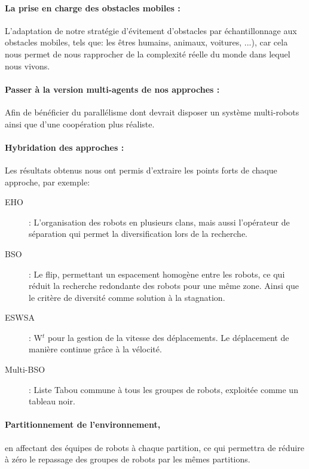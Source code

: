 \paragraph{La prise en charge des obstacles mobiles :} 
L'adaptation de notre stratégie d'évitement d'obstacles par échantillonnage aux obstacles mobiles, tels que: les êtres humains, animaux, voitures, ...), car cela nous permet de nous rapprocher de la complexité réelle du monde dans lequel nous vivons. 

\paragraph{Passer à la version multi-agents de nos approches :}
Afin de bénéficier du parallélisme dont devrait disposer un système multi-robots ainsi que d'une coopération plus réaliste.

\paragraph{Hybridation des approches :} Les résultats obtenus nous ont permis d'extraire les points forts de chaque approche, par exemple:
\begin{description}
	\item[EHO]: L'organisation des robots en plusieurs clans, mais aussi l'opérateur de séparation qui permet la diversification lors de la recherche.
	\item[BSO]: Le flip, permettant un espacement homogène entre les robots, ce qui réduit la recherche redondante des robots pour une même zone. Ainsi que le critère de diversité comme solution à la stagnation.
	\item[ESWSA]: W$^t$ pour la gestion de la vitesse des déplacements. Le déplacement de manière continue grâce à la vélocité. 
	\item[Multi-BSO] : Liste Tabou commune à tous les groupes de robots, exploitée comme un tableau noir.
\end{description}



\paragraph{Partitionnement de l'environnement,} en affectant des équipes de robots à chaque partition, ce qui permettra de réduire à zéro le repassage des groupes de robots par les mêmes partitions.




